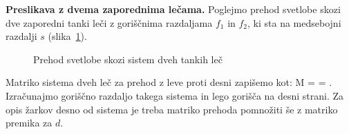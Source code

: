 \begin{example}{\bf Preslikava z dvema zaporednima lečama.}
Poglejmo prehod svetlobe skozi dve zaporedni tanki leči z goriščnima
razdaljama $f_1$ in $f_2$, ki sta na medsebojni razdalji $s$ (slika~\ref{fig:02_lecje}).
\begin{figure}[!h]
\centering
\def\svgwidth{100truemm} 

\caption{Prehod svetlobe skozi sistem dveh tankih leč}
\label{fig:02_lecje}
\end{figure}

Matriko sistema dveh leč za prehod z leve proti desni zapišemo kot:
\beq
M = 
\cdot 
\left[\begin{array}{cc}
1& s\\
0&1
\end{array}\right]\cdot
{} = 
\!\!.
\label{eq:02_54}
\eeq
Izračunajmo goriščno razdaljo takega sistema in lego gorišča
na desni strani. Za opis  žarkov desno
od sistema je treba matriko prehoda pomnožiti še z matriko premika za $d$. 


\end{example}
